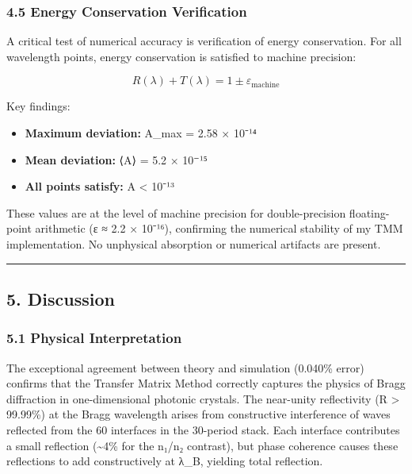 \documentclass[
]{article}
\providecommand{\tightlist}{%
  \setlength{\itemsep}{0pt}\setlength{\parskip}{0pt}}
\begin{document}
\subsubsection{4.5 Energy Conservation
Verification}\label{energy-conservation-verification}

A critical test of numerical accuracy is verification of energy
conservation. For all wavelength points, energy conservation is
satisfied to machine precision:

\[R(\lambda) + T(\lambda) = 1 \pm \varepsilon_{\text{machine}}\]

Key findings:

\begin{itemize}
\tightlist
\item
  \textbf{Maximum deviation:} \textbar A\textbar\_max = 2.58 × 10⁻¹⁴
\item
  \textbf{Mean deviation:} ⟨\textbar A\textbar⟩ = 5.2 × 10⁻¹⁵
\item
  \textbf{All points satisfy:} \textbar A\textbar{} \textless{} 10⁻¹³
\end{itemize}

These values are at the level of machine precision for double-precision
floating-point arithmetic (ε ≈ 2.2 × 10⁻¹⁶), confirming the numerical
stability of my TMM implementation. No unphysical absorption or
numerical artifacts are present.

\begin{center}\rule{0.5\linewidth}{0.5pt}\end{center}

\subsection{5. Discussion}\label{discussion}

\subsubsection{5.1 Physical
Interpretation}\label{physical-interpretation}

The exceptional agreement between theory and simulation (0.040\% error)
confirms that the Transfer Matrix Method correctly captures the physics
of Bragg diffraction in one-dimensional photonic crystals. The
near-unity reflectivity (R \textgreater{} 99.99\%) at the Bragg
wavelength arises from constructive interference of waves reflected from
the 60 interfaces in the 30-period stack. Each interface contributes a
small reflection (\textasciitilde4\% for the n₁/n₂ contrast), but phase
coherence causes these reflections to add constructively at λ\_B,
yielding total reflection.
\end{document}
